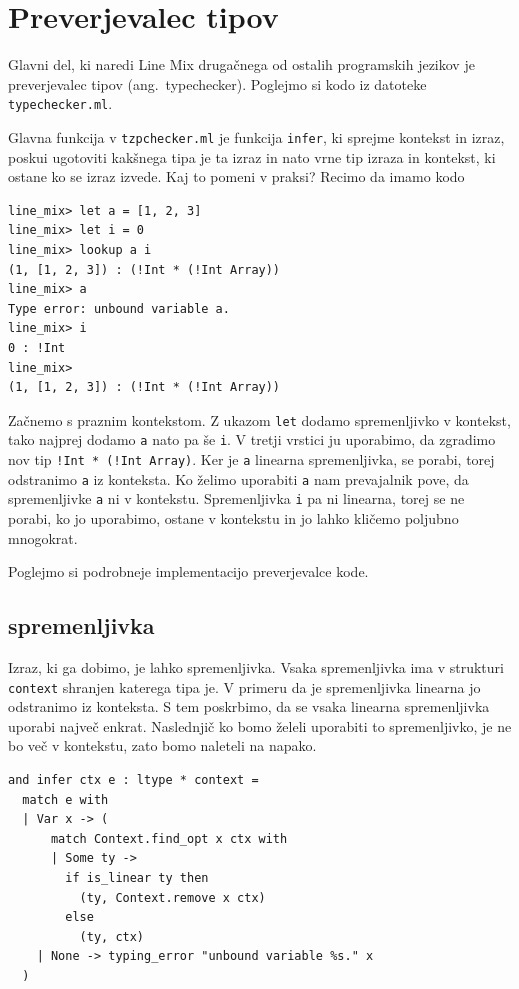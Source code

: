 \section{Preverjevalec tipov}

Glavni del, ki naredi Line Mix drugačnega od ostalih programskih jezikov je preverjevalec tipov (ang.\ typechecker). Poglejmo si kodo iz datoteke \verb|typechecker.ml|.

Glavna funkcija v \verb|tzpchecker.ml| je funkcija \verb|infer|, ki sprejme kontekst in izraz, poskui ugotoviti kakšnega tipa je ta izraz in nato vrne tip izraza in kontekst, ki ostane ko se izraz izvede. 
Kaj to pomeni v praksi? Recimo da imamo kodo
%
\begin{verbatim}
line_mix> let a = [1, 2, 3]
line_mix> let i = 0
line_mix> lookup a i
(1, [1, 2, 3]) : (!Int * (!Int Array))
line_mix> a
Type error: unbound variable a.
line_mix> i
0 : !Int
line_mix> 
(1, [1, 2, 3]) : (!Int * (!Int Array))
\end{verbatim}
Začnemo s praznim kontekstom. Z ukazom \verb|let| dodamo spremenljivko v kontekst, tako najprej dodamo \verb|a| nato pa še \verb|i|. V tretji vrstici ju uporabimo, da zgradimo nov tip \verb|!Int * (!Int Array)|. Ker je \verb|a| linearna spremenljivka, se porabi, torej odstranimo \verb|a| iz konteksta. Ko želimo uporabiti \verb|a| nam prevajalnik pove, da spremenljivke \verb|a| ni v kontekstu. Spremenljivka \verb|i| pa ni linearna, torej se ne porabi, ko jo uporabimo, ostane v kontekstu in jo lahko kličemo poljubno mnogokrat.


Poglejmo si podrobneje implementacijo preverjevalce kode.

\subsection{spremenljivka}
Izraz, ki ga dobimo, je lahko spremenljivka. Vsaka spremenljivka ima v strukturi \verb|context| shranjen katerega tipa je. V primeru da je spremenljivka linearna jo odstranimo iz konteksta. S tem poskrbimo, da se vsaka linearna spremenljivka uporabi največ enkrat. Naslednjič ko bomo želeli uporabiti to spremenljivko, je ne bo več v kontekstu, zato bomo naleteli na napako. 
\begin{verbatim}
and infer ctx e : ltype * context =
  match e with
  | Var x -> (
      match Context.find_opt x ctx with
      | Some ty -> 
        if is_linear ty then
          (ty, Context.remove x ctx)
        else
          (ty, ctx)
    | None -> typing_error "unbound variable %s." x
  )
\end{verbatim}


